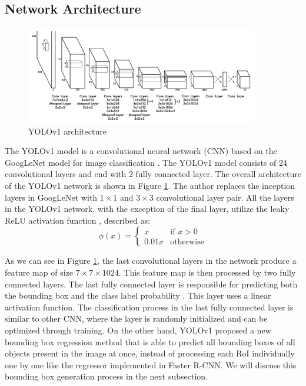 \subsection{Network Architecture}

\begin{figure}[!ht]
    \centering
    \includegraphics[width=4in]{figures/yolov1_archite.png}
    \caption{YOLOv1 architecture \cite{yolov1_2016}} 
    \label{fig:yolov1_archite}
\end{figure}

The YOLOv1 model is a convolutional neural network (CNN) based on the GoogLeNet model for image classiﬁcation \cite{googlenet_2015}. The YOLOv1 model consists of 24 convolutional layers and end with 2 fully connected layer. The overall architecture of the YOLOv1 network is shown in Figure \ref{fig:yolov1_archite}. The author replaces the inception layers in GoogLeNet with $1 \times 1$ and $3 \times 3$ convolutional layer pair. All the layers in the YOLOv1 network, with the exception of the final layer, utilize the leaky ReLU activation function \cite{leaky_relu}, described as:
\begin{equation*}
    \phi(x) = 
    \begin{cases}
        x      & \text{if } x > 0 \\
        0.01 x & \text{otherwise}
    \end{cases}
\end{equation*}

As we can see in Figure \ref{fig:yolov1_archite}, the last convolutional layers in the network produce a feature map of size $7 \times 7 \times 1024$. This feature map is then processed by two fully connected layers. The last fully connected layer is responsible for predicting both the bounding box and the class label probability \cite{yolov1_2016}. This layer uses a linear activation function. The classification process in the last fully connected layer is similar to other CNN, where the layer is randomly initialized and can be optimized through training. On the other hand, YOLOv1 proposed a new bounding box regression method that is able to predict all bounding boxes of all objects present in the image at once, instead of processing each RoI individually one by one like the regressor implemented in Faster R-CNN. We will discuss this bounding box generation process in the next subsection.

